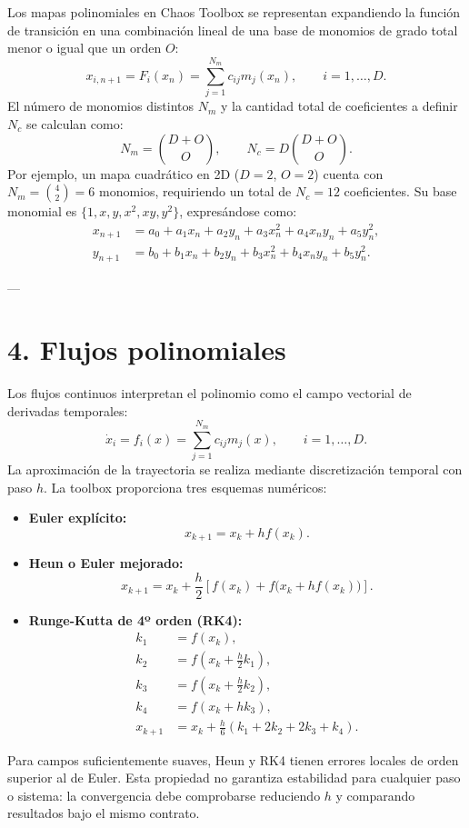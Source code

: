\documentclass[11pt]{article}
\begin{document}
Los mapas polinomiales en Chaos Toolbox se representan expandiendo la función de transición en una combinación lineal de una base de monomios de grado total menor o igual que un orden $O$:
\[
x_{i,n+1} = F_i(x_n) = \sum_{j=1}^{N_m} c_{ij} m_j(x_n), \qquad i = 1, \ldots, D.
\]
El número de monomios distintos $N_m$ y la cantidad total de coeficientes a definir $N_c$ se calculan como:
\[
N_m = \binom{D+O}{O}, \qquad N_c = D \binom{D+O}{O}.
\]
Por ejemplo, un mapa cuadrático en 2D ($D=2$, $O=2$) cuenta con $N_m = \binom{4}{2} = 6$ monomios, requiriendo un total de $N_c = 12$ coeficientes. Su base monomial es $\{1, x, y, x^2, xy, y^2\}$, expresándose como:
\[
\begin{aligned}
x_{n+1} &= a_0 + a_1 x_n + a_2 y_n + a_3 x_n^2 + a_4 x_n y_n + a_5 y_n^2, \\
y_{n+1} &= b_0 + b_1 x_n + b_2 y_n + b_3 x_n^2 + b_4 x_n y_n + b_5 y_n^2.
\end{aligned}
\]

---

\section{4. Flujos polinomiales}

Los flujos continuos interpretan el polinomio como el campo vectorial de derivadas temporales:
\[
\dot{x}_i = f_i(x) = \sum_{j=1}^{N_m} c_{ij} m_j(x), \qquad i = 1, \ldots, D.
\]
La aproximación de la trayectoria se realiza mediante discretización temporal con paso $h$. La toolbox proporciona tres esquemas numéricos:
\begin{itemize}
  \item \textbf{Euler explícito:}
        \[
        x_{k+1} = x_k + h f(x_k).
        \]
  \item \textbf{Heun o Euler mejorado:}
        \[
        x_{k+1}=x_k+\frac{h}{2}\left[f(x_k)+f\bigl(x_k+h f(x_k)\bigr)\right].
        \]
  \item \textbf{Runge-Kutta de 4º orden (RK4):}
        \[
        \begin{aligned}
        k_1 &= f(x_k), \\
        k_2 &= f\left(x_k + \frac{h}{2} k_1\right), \\
        k_3 &= f\left(x_k + \frac{h}{2} k_2\right), \\
        k_4 &= f(x_k + h k_3), \\
        x_{k+1} &= x_k + \frac{h}{6}(k_1 + 2k_2 + 2k_3 + k_4).
        \end{aligned}
        \]
\end{itemize}
Para campos suficientemente suaves, Heun y RK4 tienen errores locales de orden superior al de Euler. Esta propiedad no garantiza estabilidad para cualquier paso o sistema: la convergencia debe comprobarse reduciendo $h$ y comparando resultados bajo el mismo contrato.
\end{document}
